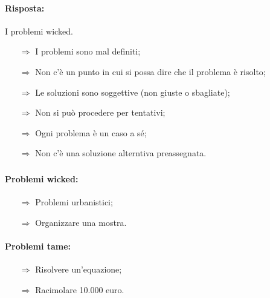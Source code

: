 
\paragraph{Risposta:} I problemi wicked.

\begin{itemize}
    \item [$\Rightarrow$] I problemi sono mal definiti;
    \item [$\Rightarrow$] Non c'è un punto in cui si possa dire che il problema è risolto;
    \item [$\Rightarrow$] Le soluzioni sono soggettive (non giuste o sbagliate);
    \item [$\Rightarrow$] Non si può procedere per tentativi;
    \item [$\Rightarrow$] Ogni problema è un caso a sé;
    \item [$\Rightarrow$] Non c'è una soluzione alterntiva preassegnata.
\end{itemize}

\subsubsection{}


\paragraph{Problemi wicked:}

\begin{itemize}
    \item [$\Rightarrow$] Problemi urbanistici;
    \item [$\Rightarrow$] Organizzare una mostra.
\end{itemize}

\paragraph{Problemi tame:}

\begin{itemize}
    \item [$\Rightarrow$] Risolvere un'equazione;
    \item [$\Rightarrow$] Racimolare 10.000 euro.
\end{itemize}

